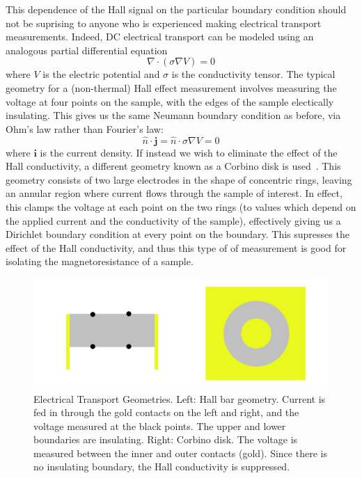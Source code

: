 \documentclass{thesis-umich}
\begin{document}
This dependence of the Hall signal on the particular boundary condition should
not be suprising to anyone who is experienced making electrical transport
measurements. Indeed, DC electrical transport can be modeled using an analogous
partial differential equation \[ \nabla \cdot (\sigma \nabla V) = 0 \] where
$V$ is the electric potential and $\sigma$ is the conductivity tensor. The
typical geometry for a (non-thermal) Hall effect measurement involves measuring
the voltage at four points on the sample, with the edges of the sample
electically insulating. This gives us the same Neumann boundary condition as
before, via Ohm's law rather than Fourier's law: \[ \hat{n} \cdot \mathbf{j} =
\hat{n} \cdot \sigma \nabla V = 0\] where $\mathbf{i}$ is the current density.
If instead we wish to eliminate the effect of the Hall conductivity, a
different geometry known as a Corbino disk is used~\cite{Eo2018}. This geometry consists of
two large electrodes in the shape of concentric rings, leaving an annular
region where current flows through the sample of interest. In effect, this
clamps the voltage at each point on the two rings (to values which depend on
the applied current and the conductivity of the sample), effectively giving us
a Dirichlet boundary condition at every point on the boundary. This supresses
the effect of the Hall conductivity, and thus this type of of measurement is
good for isolating the magnetoresistance of a sample.

\begin{figure} \centering
	\includegraphics[width=\textwidth]{figures/ehall_geometry.pdf}
	\caption[Electrical Transport Geometries]{Electrical Transport
	Geometries. Left: Hall bar geometry. Current is fed in through the gold
contacts on the left and right, and the voltage measured at the black points.
The upper and lower boundaries are insulating. Right: Corbino disk. The voltage
is measured between the inner and outer contacts (gold). Since there is no
insulating boundary, the Hall conductivity is suppressed.} \end{figure}
\end{document}
